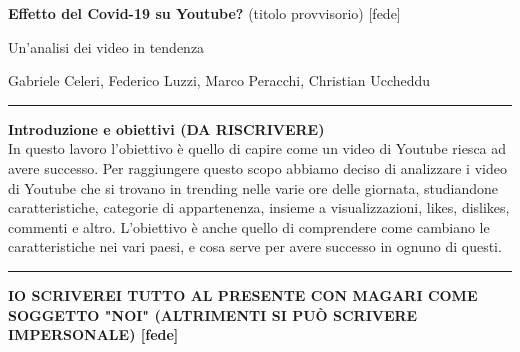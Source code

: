 \documentclass[10pt, a4paper,openany]{article}
\begin{document}
\begin{center}
\huge\textbf{Effetto del Covid-19 su Youtube?} (titolo provvisorio) [fede]

Un'analisi dei video in tendenza
\end{center}

\begin{center}
Gabriele Celeri, Federico Luzzi,  Marco Peracchi, Christian Uccheddu
\end{center}

\hrule
\vspace{0.5cm}

\begin{center}\textbf{{Introduzione e obiettivi} (DA RISCRIVERE)}
\\

In questo lavoro l'obiettivo è quello di capire come un video di Youtube riesca ad avere successo. Per raggiungere questo scopo abbiamo deciso di analizzare i video di Youtube che si trovano in trending nelle varie ore delle giornata, studiandone caratteristiche, categorie di appartenenza, insieme a visualizzazioni, likes, dislikes, commenti e altro.
L'obiettivo è anche quello di comprendere come cambiano le caratteristiche nei vari paesi, e cosa serve per avere successo in ognuno di questi.

\vspace{0.5cm}
\hrule
\end{center}
\textbf{IO SCRIVEREI TUTTO AL PRESENTE CON MAGARI COME SOGGETTO "NOI" (ALTRIMENTI SI PUÒ SCRIVERE IMPERSONALE) [fede]}



  
\end{document}

